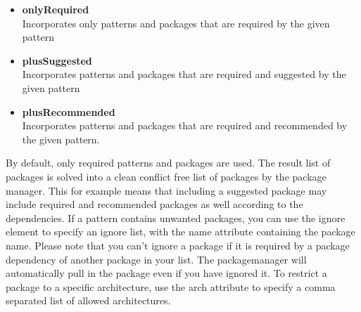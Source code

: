\begin{itemize}
\item \textbf{onlyRequired}\\
      Incorporates only patterns and packages that are required by the
      given pattern
\item \textbf{plusSuggested}\\
      Incorporates patterns and packages that are required
      and suggested by the given pattern
\item \textbf{plusRecommended}\\
      Incorporates patterns and packages that are required and
      recommended by the given pattern.
\end{itemize}

By default, only required patterns and packages are used. The result
list of packages is solved into a clean conflict free list of packages
by the package manager. This for example means that including a suggested
package may include required and recommended packages as well according
to the dependencies. If a pattern contains unwanted packages, you can use
the ignore element to specify an ignore list, with the name attribute
containing the package name. Please note that you can't ignore a package
if it is required by a package dependency of another package in your list.
The packagemanager will automatically pull in the package even if you have
ignored it. To restrict a package to a specific architecture, use
the arch attribute to specify a comma separated list of allowed
architectures.

